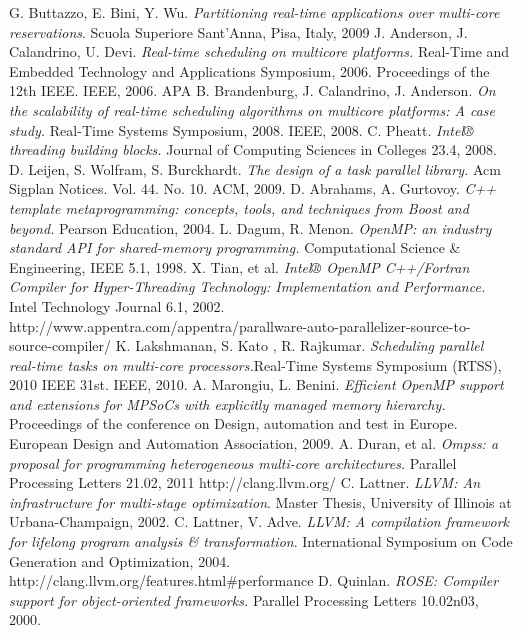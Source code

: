 \documentclass[a4paper,12pt,oneside]{book}
\begin{document}
\begin{thebibliography}{30}
 G. Buttazzo, E. Bini, Y. Wu. \emph{Partitioning real-time applications over multi-core reservations}. Scuola Superiore Sant’Anna, Pisa, Italy, 2009
J. Anderson, J. Calandrino, U. Devi. \emph{Real-time scheduling on multicore platforms.} Real-Time and Embedded Technology and Applications Symposium, 2006. Proceedings of the 12th IEEE. IEEE, 2006.
APA	
B. Brandenburg, J. Calandrino,  J. Anderson. \emph{On the scalability of real-time scheduling algorithms on multicore platforms: A case study.} Real-Time Systems Symposium, 2008. IEEE, 2008.
 C. Pheatt. \emph{Intel® threading building blocks.} Journal of Computing Sciences in Colleges 23.4, 2008.
 D. Leijen, S. Wolfram, S. Burckhardt. \emph{The design of a task parallel library.} Acm Sigplan Notices. Vol. 44. No. 10. ACM, 2009.
 D. Abrahams, A. Gurtovoy. \emph{C++ template metaprogramming: concepts, tools, and techniques from Boost and beyond.} Pearson Education, 2004.
 L. Dagum, R. Menon. \emph{OpenMP: an industry standard API for shared-memory programming.} Computational Science \& Engineering, IEEE 5.1, 1998.
 X. Tian, et al. \emph{Intel® OpenMP C++/Fortran Compiler for Hyper-Threading Technology: Implementation and Performance.} Intel Technology Journal 6.1, 2002.
 http://www.appentra.com/appentra/parallware-auto-parallelizer-source-to-source-compiler/
K. Lakshmanan, S. Kato , R. Rajkumar. \emph{Scheduling parallel real-time tasks on multi-core processors.}Real-Time Systems Symposium (RTSS), 2010 IEEE 31st. IEEE, 2010.
A. Marongiu, L. Benini. \emph{Efficient OpenMP support and extensions for MPSoCs with explicitly managed memory hierarchy.} Proceedings of the conference on Design, automation and test in Europe. European Design and Automation Association, 2009.
 A. Duran, et al. \emph{Ompss: a proposal for programming heterogeneous multi-core architectures.} Parallel Processing Letters 21.02, 2011
http://clang.llvm.org/
 C. Lattner. \emph{LLVM: An infrastructure for multi-stage optimization}. Master Thesis, University of Illinois at Urbana-Champaign, 2002.
 C. Lattner, V. Adve. \emph{LLVM: A compilation framework for lifelong program analysis \& transformation}. International Symposium on Code Generation and Optimization, 2004. 
http://clang.llvm.org/features.html\#performance
 D. Quinlan. \emph{ROSE: Compiler support for object-oriented frameworks.} Parallel Processing Letters 10.02n03, 2000.

\end{thebibliography}
\end{document}
